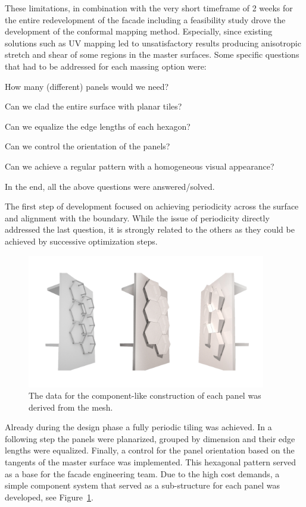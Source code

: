 \documentclass[article.tex]{subfiles}
\begin{document}
These limitations, in combination with the very short timeframe of 2
weeks for the entire redevelopment of the facade including a
feasibility study drove the development of the conformal mapping
method. Especially, since existing solutions such as UV mapping led to
unsatisfactory results producing anisotropic stretch and shear of some
regions in the master surfaces.  Some specific questions that had to
be addressed for each massing option were:
\smallskip
\begin{compactitem}
\item How many (different) panels would we need?
\item Can we clad the entire surface with planar tiles?
\item Can we equalize the edge lengths of each hexagon?
\item Can we control the orientation of the panels?
\item Can we achieve a regular pattern with a homogeneous visual
  appearance?
\end{compactitem}
\smallskip
In the end, all the above questions were answered/solved.

The first step of development focused on achieving periodicity across
the surface and alignment with the boundary. While the issue of
periodicity directly addressed the last question, it is strongly
related to the others as they could be achieved by successive
optimization steps.

\begin{figure}[t]
  \centering
  \includegraphics[width=0.93\textwidth]{images/henn/panel_construction.jpg}
  \caption{The data for the component-like construction of each panel was derived from the mesh.}
  \label{fig:panel_construction}
\end{figure}

Already during the design phase a fully periodic tiling was
achieved. In a following step the panels were planarized, grouped by
dimension and their edge lengths were equalized. Finally, a control
for the panel orientation based on the tangents of the \nurbs master
surface was implemented. This hexagonal pattern served as a base for
the facade engineering team. Due to the high cost demands, a simple
component system that served as a sub-structure for each panel was
developed, see Figure~\ref{fig:panel_construction}.
\end{document}
